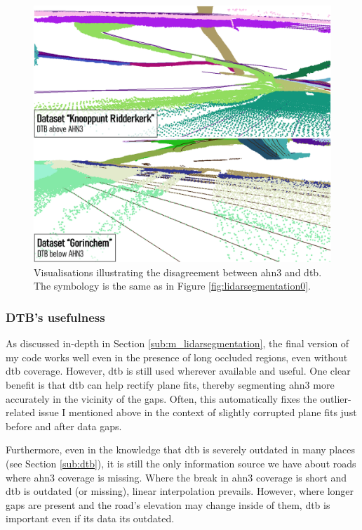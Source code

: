 \begin{figure}[h]
    \centering
    \includegraphics[width=0.9\linewidth]{final_report/figs/lidarsegmentation1.png}
    \caption[Renders showing the disagreement between AHN3 and DTB]{Visualisations illustrating the disagreement between \ac{ahn3} and \ac{dtb}. The symbology is the same as in Figure \ref{fig:lidarsegmentation0}.}
    \label{fig:lidarsegmentation1}
\end{figure}

\subsubsection{DTB's usefulness}

As discussed in-depth in Section \ref{sub:m_lidarsegmentation}, the final version of my code works well even in the presence of long occluded regions, even without \ac{dtb} coverage. However, \ac{dtb} is still used wherever available and useful. One clear benefit is that \ac{dtb} can help rectify plane fits, thereby segmenting \ac{ahn3} more accurately in the vicinity of the gaps. Often, this automatically fixes the outlier-related issue I mentioned above in the context of slightly corrupted plane fits just before and after data gaps.

Furthermore, even in the knowledge that \ac{dtb} is severely outdated in many places (see Section \ref{sub:dtb}), it is still the only information source we have about roads where \ac{ahn3} coverage is missing. Where the break in \ac{ahn3} coverage is short and \ac{dtb} is outdated (or missing), linear interpolation prevails. However, where longer gaps are present and the road's elevation may change inside of them, \ac{dtb} is important even if its data its outdated.

